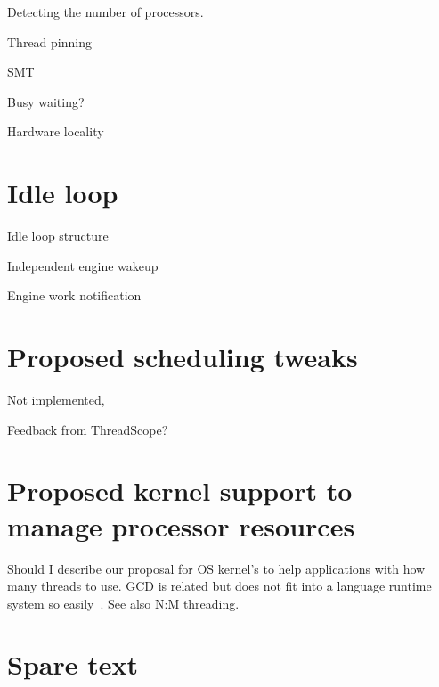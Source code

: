 Detecting the number of processors.

Thread pinning

SMT

Busy waiting?

Hardware locality

\section{Idle loop}
\label{sec:idle_loop}

Idle loop structure

Independent engine wakeup

Engine work notification

\section{Proposed scheduling tweaks}
\label{sec:proposed_tweaks}

Not implemented,

Feedback from ThreadScope?

\section{Proposed kernel support to manage processor resources}
\label{sec:kernel_scheduling_help}


Should I describe our proposal for OS kernel's to help
applications with how many threads to use.
GCD is related but does not fit into a language runtime system so
easily~\cite{apple_gcd}.
See also N:M threading.

\section{Spare text}


%
%


